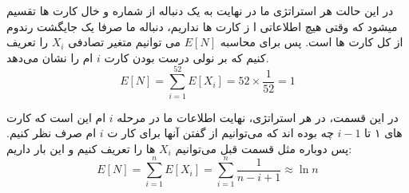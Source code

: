 \problem{}


\subproblem{}
در این حالت هر استراتژی ما در نهایت به یک دنباله 
از شماره و خال کارت ها تقسیم میشود که وقتی هیچ اطلاعاتی ا
ز کارت ها نداریم، دنباله ما صرفا یک جایگشت رندوم از کل کارت ها است. پس برای محاسبه $E[N]$ می توانیم متغیر تصادفی $X_i$ را تعریف کنیم که بر
نولی درست بودن کارت $i$ ام را نشان می‌دهد.  
\\
\[ E[N] = \sum_{i=1}^{52}E[X_i] = 52 \times \frac{1}{52} = 1 \]

\subproblem{}
در این قسمت، در هر استراتژی، نهایت اطلاعات ما در مرحله $i$ ام این است که کارت های ۱ تا $i-1$ چه بوده اند که می‌توانیم از گفتن آنها برای کار
ت $i$ ام صرف نظر کنیم. پس دوباره مثل قسمت قبل می‌توانیم $X_i$ ها را تعریف کنیم و 
این بار داریم:
\[ E[N] = \sum_{i=1}^{n}E[X_i] = \sum_{i=1}^{n} \frac{1}{n - i + 1} \approx \ln{n} \]

